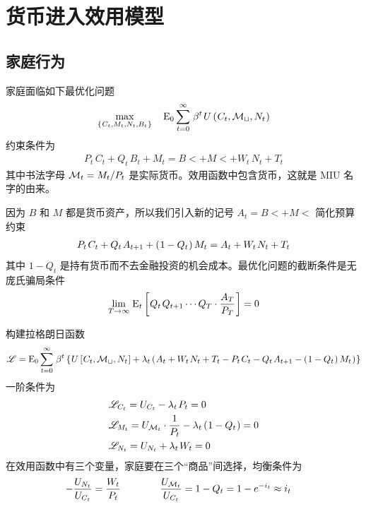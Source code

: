 \newpage
\section{货币进入效用模型}

\subsection{家庭行为}


家庭面临如下最优化问题
\begin{align*}
    \max_{\bkd{C_t,M_t,N_t,B_t}}\quad \meano\sum^\infty_{t=0}\,\beta^t\,U\bka{C_t, \cal{M_t},N_t}
\end{align*}
约束条件为
\begin{align*}
    P_t\,C_t+Q_t\,B_t+M_t=B\lt+M\lt+W_t\,N_t+T_t
\end{align*}
其中书法字母 \(\cal M_t=M_t/P_t\) 是实际货币。效用函数中包含货币，这就是 MIU 名字的由来。

因为 \(B\) 和 \(M\) 都是货币资产，所以我们引入新的记号 \(A_t=B\lt+M\lt\) 简化预算约束
\begin{align*}
    P_t\,C_t+Q_t\,A\nt+\bka{1-Q_t}M_t=A_t+W_t\,N_t+T_t
\end{align*}
其中 \(1-Q_t\) 是持有货币而不去金融投资的机会成本。最优化问题的截断条件是无庞氏骗局条件
\begin{align*}
    \lim_{T\to\infty}\,\mean_t\bks{Q_t\,Q\nt\cdots Q_T\cdot\dfrac{A_T}{P_T}}=0
\end{align*}

构建拉格朗日函数
\begin{align*}
    \scr L=\meano\sum^\infty_{t=0}\,\beta^t\bkd{U\bks{C_t, \cal{M_t},N_t}+\lambda_t\bka{A_t+W_t\,N_t+T_t-P_t\,C_t-Q_t\,A\nt-\bka{1-Q_t}M_t}}
\end{align*}
一阶条件为
\begin{align*}
    & \scr L_{C_t}=U_{C_t}-\lambda_t\,P_t=0\\
    & \scr L_{M_t}=U_{\cal M_t}\cdot\dfrac{1}{P_t}-\lambda_t\bka{1-Q_t}=0\\
    & \scr L_{N_t}=U_{N_t}+\lambda_t\,W_t=0
\end{align*}
在效用函数中有三个变量，家庭要在三个“商品”间选择，均衡条件为
\begin{align}
    -\dfrac{U_{N_t}}{U_{C_t}}=\dfrac{W_t}{P_t}\qquad\qquad
    \dfrac{U_{\cal M_t}}{U_{C_t}}&=1-Q_t=1-e^{-i_t}\approx i_t\label{eq:MIU-equilibrium}
\end{align}

